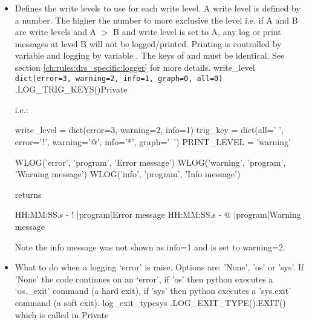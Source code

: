 \begin{itemize}
\ifdevguide

\item \label{text:write_level}
\begin{minipage}[t]{\textwidth}
{Defines the write levels to use for each write level. A write level is defined by a number. The higher the number to more exclusive the level i.e. if A and B are write levels and A $>$ B and write level is set to A, any log or print messages at level B will not be logged/printed. Printing is controlled by variable  and logging by variable . The keys of  and  must be identical. See section \ref{ch:rules:drs_specific:logger} for more details.}
{write\_level}
{\lstinline[style=pythoninline]| dict(error=3, warning=2, info=1, graph=0, all=0) |}
{\AllRecipes}{\spirouConst.LOG\_TRIG\_KEYS()}{\AllRecipes}{Private}
\vspace{-0.25cm}
\begin{thighlight}
i.e.: 
\begin{pythonbox}
write_level = dict(error=3, warning=2, info=1)
trig_key = dict(all=' ', error='!', warning='@', info='*', graph='~')
PRINT_LEVEL = 'warning'

WLOG('error', 'program', 'Error message')
WLOG('warning', 'program', 'Warning message')
WLOG('info', 'program', 'Info message')
\end{pythonbox}
returns
\begin{cmdboxprint}
HH:MM:SS.s - ! |program|Error message
HH:MM:SS.s - @ |program|Warning message
\end{cmdboxprint}
\begin{note}
Note the info message was not shown as info=1 and  is set to warning=2.
\end{note}
\end{thighlight}
\end{minipage}
\fi


\ifdevguide
\item \label{text:log_exit_type} 
{What to do when a logging `error' is raise. Options are: 'None', 'os' or 'sys'. If 'None' the code continues on an `error', if 'os' then python executes a `os.\_exit' command (a hard exit), if 'sys' then python executes a 'sys.exit' command (a soft exit).}
{log\_exit\_type}{sys}
{\AllRecipes}{\spirouConst.LOG\_EXIT\_TYPE()}{\spirouConst.EXIT() which is called in \spirouLog}{Private}
\fi


\end{itemize}
